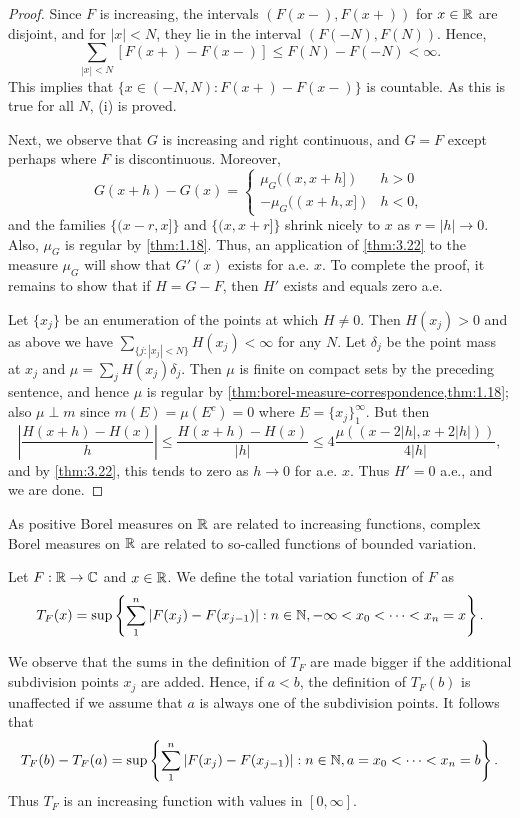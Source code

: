 \documentclass[12pt]{article} %
\begin{document}
\begin{proof}
    Since $F$ is increasing, the intervals $(F(x-), F(x+))$ for $x \in \mathbb{R}$ are disjoint, and for $|x| < N$, they lie in the interval $(F(-N), F(N))$. Hence, \[\sum_{|x| < N} [F(x+) - F(x-)] \leq F(N) - F(-N) < \infty.\] This implies that $\{x \in (-N, N) : F(x+) - F(x-)\}$ is countable. As this is true for all $N$, (i) is proved.

    Next, we observe that $G$ is increasing and right continuous, and $G = F$ except perhaps where $F$ is discontinuous. Moreover, \[G(x + h) - G(x) = \begin{cases}
        \mu_G((x, x+h]) &h > 0\\
        -\mu_G((x+h,x]) &h < 0,
    \end{cases}\] and the families $\{(x-r, x]\}$ and $\{(x, x+r]\}$ shrink nicely to $x$ as $r = |h| \to 0$. Also, $\mu_G$ is regular by \cref{thm:1.18}. Thus, an application of \cref{thm:3.22} to the measure $\mu_G$ will show that $G'(x)$ exists for a.e. $x$. To complete the proof, it remains to show that if $H = G - F$, then $H'$ exists and equals zero a.e.

    Let $\{x_j\}$ be an enumeration of the points at which $H \neq 0$. Then $H(x_j) > 0$ and as above we have $\sum_{\{j : |x_j| < N\}} H(x_j) < \infty$ for any $N$. Let $\delta_j$ be the point mass at $x_j$ and $\mu = \sum_j H(x_j) \delta_j$. Then $\mu$ is finite on compact sets by the preceding sentence, and hence $\mu$ is regular by \cref{thm:borel-measure-correspondence,thm:1.18}; also $\mu \perp m$ since $m(E) = \mu(E^c) = 0$ where $E = \{x_j\}_1^\infty$. But then \[\left|\frac{H(x + h) - H(x)}{h}\right| \leq \frac{H(x + h) - H(x)}{|h|} \leq 4\frac{\mu((x - 2|h|, x + 2|h|))}{4|h|},\] and by \cref{thm:3.22}, this tends to zero as $h \to 0$ for a.e. $x$. Thus $H' = 0$ a.e., and we are done.
\end{proof}

As positive Borel measures on $\mathbb{R}$ are related to increasing functions, complex Borel measures on $\mathbb{R}$ are related to so-called functions of bounded variation.

\begin{definition}
    Let $F : \mathbb{R} \to \mathbb{C}$ and $x \in \mathbb{R}$. We define the total variation function of $F$ as \[T_F(x) = \sup \left\{ \sum_1^n |F(x_j) - F(x_{j-1})| : n \in \mathbb{N}, -\infty < x_0 < \cdots < x_n = x\right\}.\]
\end{definition}

\noindent We observe that the sums in the definition of $T_F$ are made bigger if the additional subdivision points $x_j$ are added. Hence, if $a < b$, the definition of $T_F(b)$ is unaffected if we assume that $a$ is always one of the subdivision points. It follows that \begin{align}\label{eq:total-variation-on-ab}
    T_F(b) - T_F(a) = \sup\left\{\sum_1^n |F(x_j) - F(x_{j-1})| : n \in \mathbb{N}, a = x_0 < \cdots < x_n = b \right\}.
\end{align} Thus $T_F$ is an increasing function with values in $[0, \infty]$.
\end{document}
